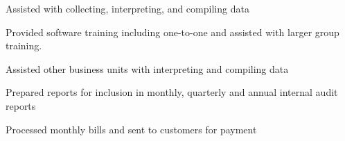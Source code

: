 \documentclass[]{deedy-resume-openfont}
\begin{document}
\begin{minipage}[t]{4in}
\vspace{\topsep} %
\begin{tightemize}
\item Assisted with collecting, interpreting, and compiling data
\item Provided software training including one-to-one and assisted with larger group training.
\item Assisted other business units with interpreting and compiling data
\end{tightemize}
\sectionsep

\begin{tightemize}
\item Prepared reports for inclusion in monthly, quarterly and annual internal audit reports
\item Processed monthly bills and sent to customers for payment
\end{tightemize}
\sectionsep




\end{minipage} 
\end{document}
